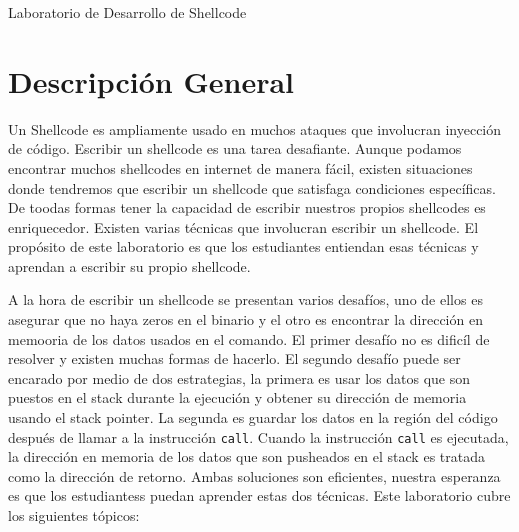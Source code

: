 
\newcommand{\commonfolder}{../../common-files}










\begin{center}
{\LARGE Laboratorio de Desarrollo de Shellcode}
\end{center}




\section{Descripción General}

Un Shellcode es ampliamente usado en muchos ataques que involucran inyección de código. Escribir un shellcode es una tarea desafiante. Aunque podamos encontrar muchos shellcodes en internet de manera fácil, existen situaciones donde tendremos que escribir un shellcode que satisfaga condiciones específicas. De toodas formas tener la capacidad de escribir nuestros propios shellcodes es enriquecedor.
Existen varias técnicas que involucran escribir un shellcode.
El propósito de este laboratorio es que los estudiantes entiendan esas técnicas y aprendan a escribir su propio shellcode.

A la hora de escribir un shellcode se presentan varios desafíos, uno de ellos es asegurar que no haya zeros en el binario y el otro es encontrar la dirección en memooria de los datos usados en el comando.
El primer desafío no es dificíl de resolver y existen muchas formas de hacerlo.
El segundo desafío puede ser encarado por medio de dos estrategias, la primera es usar los datos que son puestos en el stack durante la ejecución y obtener su dirección de memoria usando el stack pointer. La segunda es guardar los datos en la región del código después de llamar a la instrucción \texttt{call}.
Cuando la instrucción \texttt{call} es ejecutada, la dirección en memoria de los datos que son pusheados en el stack es tratada como la dirección de retorno.
Ambas soluciones son eficientes, nuestra esperanza es que los estudiantess puedan aprender estas dos técnicas.
Este laboratorio cubre los siguientes tópicos:


